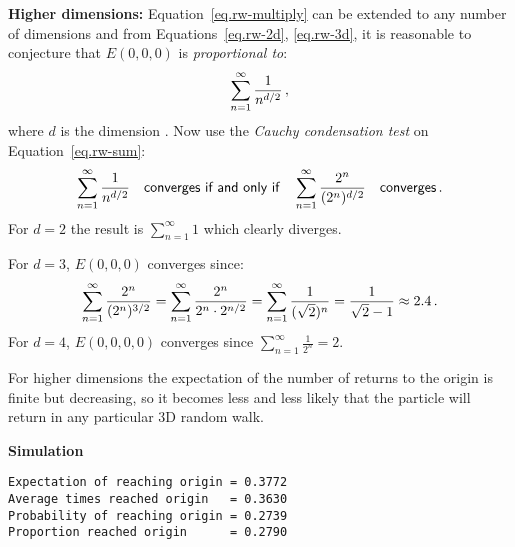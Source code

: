 \textbf{Higher dimensions:} Equation~\ref{eq.rw-multiply} can be extended to any number of dimensions and from Equations~\ref{eq.rw-2d}, \ref{eq.rw-3d}, it is reasonable to conjecture that $E(0,0,0)$ is \emph{proportional to}:
\begin{equation}
\label{eq.rw-sum}
\sum_{n=1}^{\infty} \displaystyle\frac{1}{n^{d/2}}\,,
\end{equation}
where $d$ is the dimension \cite{louigi}. Now use the \emph{Cauchy condensation test} \cite{wiki:cauchy} on Equation~\ref{eq.rw-sum}:
\[
\sum_{n=1}^{\infty} \displaystyle\frac{1}{n^{d/2}} \quad \textsf{converges if and only if} \quad \sum_{n=1}^{\infty} \displaystyle\frac{2^n}{(2^n)^{d/2}} \quad \textsf{converges}\,.
\]
For $d=2$ the result is $\sum_{n=1}^{\infty} 1$ which clearly diverges.

For $d=3$, $E(0,0,0)$ converges since:
\[
\sum_{n=1}^{\infty} \displaystyle\frac{2^n}{(2^n)^{3/2}}=\sum_{n=1}^{\infty} \displaystyle\frac{2^n}{2^n\cdot 2^{n/2}}=\sum_{n=1}^{\infty} \displaystyle\frac{1}{(\sqrt{2})^n}=\frac{1}{\sqrt{2}-1}\approx 2.4\,.
\]
For $d=4$, $E(0,0,0,0)$ converges since $\sum_{n=1}^{\infty} \frac{1}{2^n}=2$.

For higher dimensions the expectation of the number of returns to the origin is finite but decreasing, so it becomes less and less likely that the particle will return in any particular 3D random walk.

\textbf{Simulation}
\begin{verbatim}
Expectation of reaching origin = 0.3772
Average times reached origin   = 0.3630
Probability of reaching origin = 0.2739
Proportion reached origin      = 0.2790
\end{verbatim}


